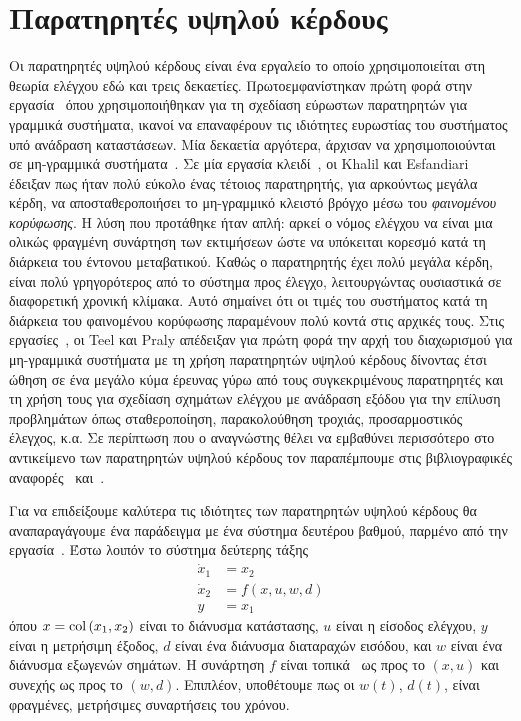 \chapter[]{Παρατηρητές υψηλού κέρδους}
\label{chap:hgo}
Οι παρατηρητές υψηλού κέρδους είναι ένα εργαλείο το οποίο χρησιμοποιείται στη θεωρία ελέγχου εδώ και τρεις δεκαετίες. Πρωτοεμφανίστηκαν πρώτη φορά στην εργασία~\cite{doyle1979robustness} όπου χρησιμοποιήθηκαν για τη σχεδίαση εύρωστων παρατηρητών για γραμμικά συστήματα, ικανοί να επαναφέρουν τις ιδιότητες ευρωστίας του συστήματος υπό ανάδραση καταστάσεων. Μία δεκαετία αργότερα, άρχισαν να χρησιμοποιούνται σε μη-γραμμικά συστήματα~\cite{esfandiari1987observer,saberi1990observer}. Σε μία εργασία κλειδί~\cite{Esfandiari1992}, οι \textlatin{Khalil} και \textlatin{Esfandiari} έδειξαν πως ήταν πολύ εύκολο ένας τέτοιος παρατηρητής, για αρκούντως μεγάλα κέρδη, να αποσταθεροποιήσει το μη-γραμμικό κλειστό βρόγχο μέσω του \emph{φαινομένου κορύφωσης}. Η λύση που προτάθηκε ήταν απλή: αρκεί ο νόμος ελέγχου να είναι μια ολικώς φραγμένη συνάρτηση των εκτιμήσεων ώστε να υπόκειται κορεσμό κατά τη διάρκεια του έντονου μεταβατικού. Καθώς ο παρατηρητής έχει πολύ μεγάλα κέρδη, είναι πολύ γρηγορότερος από το σύστημα προς έλεγχο, λειτουργώντας ουσιαστικά σε διαφορετική χρονική κλίμακα. Αυτό σημαίνει ότι οι τιμές του συστήματος κατά τη διάρκεια του φαινομένου κορύφωσης παραμένουν πολύ κοντά στις αρχικές τους. Στις εργασίες~\cite{teel1994global,teel1995tools}, οι \textlatin{Teel} και \textlatin{Praly} απέδειξαν για πρώτη φορά την αρχή του διαχωρισμού για μη-γραμμικά συστήματα με τη χρήση παρατηρητών υψηλού κέρδους δίνοντας έτσι ώθηση σε ένα μεγάλο κύμα έρευνας γύρω από τους συγκεκριμένους παρατηρητές και τη χρήση τους για σχεδίαση σχημάτων ελέγχου με ανάδραση εξόδου για την επίλυση προβλημάτων όπως σταθεροποίηση, παρακολούθηση τροχιάς, προσαρμοστικός έλεγχος, κ.α. Σε περίπτωση που ο αναγνώστης θέλει να εμβαθύνει περισσότερο στο αντικείμενο των παρατηρητών υψηλού κέρδους τον παραπέμπουμε στις βιβλιογραφικές αναφορές~\cite{khalil2008high} και~\cite{Khalil2013}.

Για να επιδείξουμε καλύτερα τις ιδιότητες των παρατηρητών υψηλού κέρδους θα αναπαραγάγουμε ένα παράδειγμα με ένα σύστημα δευτέρου βαθμού, παρμένο από την εργασία~\cite{Khalil2013}. Έστω λοιπόν το σύστημα δεύτερης τάξης
\begin{equation}
    \label{eq:hgo_sys1}
    \begin{split}
        \dot x_1 &= x_2 \\
        \dot x_2 &= f(x, u, w, d)\\
        y &= x_1
    \end{split}
\end{equation}
όπου $x = \col\pqty{x_1, x_2}$ είναι το διάνυσμα κατάστασης, $u$ είναι η είσοδος ελέγχου, $y$ είναι η μετρήσιμη έξοδος, $d$ είναι ένα διάνυσμα διαταραχών εισόδου, και $w$ είναι ένα διάνυσμα εξωγενών σημάτων. Η συνάρτηση $f$ είναι τοπικά \lip\ ως προς το $(x,u)$ και συνεχής ως προς το $(w,d)$. Επιπλέον, υποθέτουμε πως οι $w(t)$, $d(t)$, είναι φραγμένες, μετρήσιμες συναρτήσεις του χρόνου. 


